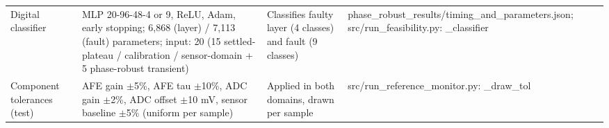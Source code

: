 \begin{table}[H]
\begin{tabular}{p{3.2cm}p{3.6cm}p{3.6cm}p{3.6cm}}
Digital classifier & MLP 20-96-48-{4 or 9}, ReLU, Adam, early stopping; 6,868 (layer) / 7,113 (fault) parameters; input: 20 (15 settled-plateau / calibration / sensor-domain + 5 phase-robust transient) & Classifies faulty layer (4 classes) and fault (9 classes) & phase\_robust\_results/timing\_and\_parameters.json; src/run\_feasibility.py: \_classifier \\
Component tolerances (test) & AFE gain $\pm$5\%, AFE tau $\pm$10\%, ADC gain $\pm$2\%, ADC offset $\pm$10 mV, sensor baseline $\pm$5\% (uniform per sample) & Applied in both domains, drawn per sample & src/run\_reference\_monitor.py: \_draw\_tol \\
\bottomrule
\end{tabular}
\par\vspace{2pt}
\end{table}

